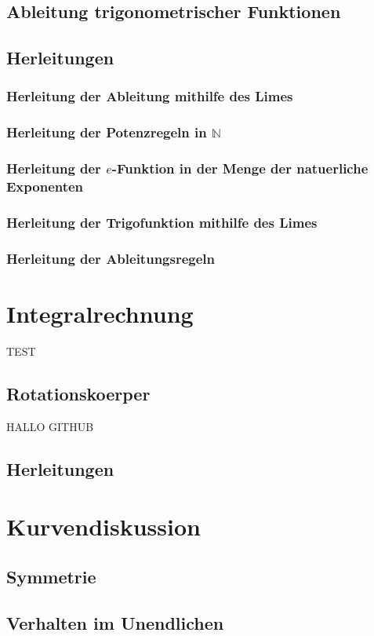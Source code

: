 \documentclass[a4paper]{article} %
\begin{document}
	\subsection{Ableitung trigonometrischer Funktionen}
	\subsection{Herleitungen}
	\subsubsection{Herleitung der Ableitung mithilfe des Limes}
	\subsubsection{Herleitung der Potenzregeln in  $\mathbb{N}$}
	\subsubsection{Herleitung der $e$-Funktion in der Menge der natuerliche Exponenten}
	\subsubsection{Herleitung der Trigofunktion mithilfe des Limes}
	\subsubsection{Herleitung der Ableitungsregeln}
	\section{Integralrechnung}
	TEST

	\subsection{Rotationskoerper}  
	HALLO GITHUB                                                       
	\subsection{Herleitungen}
	\section{Kurvendiskussion}
	\subsection{Symmetrie}
	\subsection{Verhalten im Unendlichen}
\end{document}
